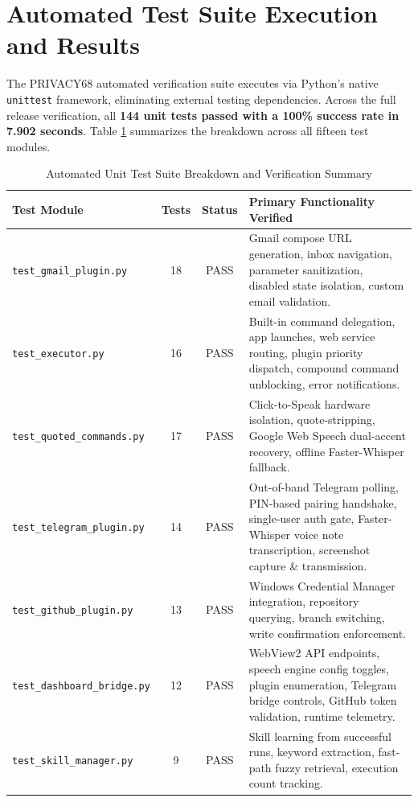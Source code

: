 \section{Automated Test Suite Execution and Results}
The PRIVACY68 automated verification suite executes via Python's native \texttt{unittest} framework, eliminating external testing dependencies. Across the full release verification, all \textbf{144 unit tests passed with a 100\% success rate in 7.902 seconds}. Table \ref{tab:test_suite_breakdown} summarizes the breakdown across all fifteen test modules.

\begin{table}[htbp]
\centering
\scriptsize
\caption{Automated Unit Test Suite Breakdown and Verification Summary}
\label{tab:test_suite_breakdown}
\begin{tabularx}{\textwidth}{|l|c|c|X|}
\hline
\textbf{Test Module} & \textbf{Tests} & \textbf{Status} & \textbf{Primary Functionality Verified} \\ \hline
\texttt{test\_gmail\_plugin.py} & 18 & PASS & Gmail compose URL generation, inbox navigation, parameter sanitization, disabled state isolation, custom email validation. \\ \hline
\texttt{test\_executor.py} & 16 & PASS & Built-in command delegation, app launches, web service routing, plugin priority dispatch, compound command unblocking, error notifications. \\ \hline
\texttt{test\_quoted\_commands.py} & 17 & PASS & Click-to-Speak hardware isolation, quote-stripping, Google Web Speech dual-accent recovery, offline Faster-Whisper fallback. \\ \hline
\texttt{test\_telegram\_plugin.py} & 14 & PASS & Out-of-band Telegram polling, PIN-based pairing handshake, single-user auth gate, Faster-Whisper voice note transcription, screenshot capture \& transmission. \\ \hline
\texttt{test\_github\_plugin.py} & 13 & PASS & Windows Credential Manager integration, repository querying, branch switching, write confirmation enforcement. \\ \hline
\texttt{test\_dashboard\_bridge.py} & 12 & PASS & WebView2 API endpoints, speech engine config toggles, plugin enumeration, Telegram bridge controls, GitHub token validation, runtime telemetry. \\ \hline
\texttt{test\_skill\_manager.py} & 9 & PASS & Skill learning from successful runs, keyword extraction, fast-path fuzzy retrieval, execution count tracking. \\ \hline

\end{tabularx}
\end{table}
